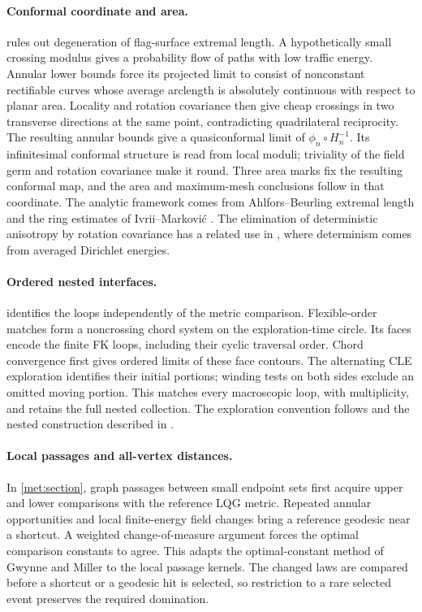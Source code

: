 \documentclass[11pt]{article}
\numberwithin{equation}{section}
\theoremstyle{definition}
\theoremstyle{remark}
\newcommand{\1}{\mathbf 1}
\begin{document}
\paragraph{Conformal coordinate and area.}
 rules out degeneration of flag-surface extremal
length. A hypothetically small crossing modulus gives a probability
flow of paths with low traffic energy. Annular lower bounds force its
projected limit to consist of nonconstant rectifiable curves whose
average arclength is absolutely continuous with respect to planar area.
Locality and rotation covariance then give cheap crossings in two
transverse directions at the same point, contradicting quadrilateral
reciprocity. The resulting annular bounds give a quasiconformal limit
of $\phi_n\circ H_n^{-1}$. Its infinitesimal conformal structure is
read from local moduli; triviality of the field germ and rotation
covariance make it round. Three area marks fix the resulting conformal
map, and the area and maximum-mesh conclusions follow in that coordinate.
The analytic framework comes from Ahlfors--Beurling extremal length
\citep{AhlforsBeurling1952ConformalInvariants} and the ring estimates of
Ivrii--Markovi\'c \citep{IvriiMarkovic2019}. The elimination of
deterministic anisotropy by rotation covariance has a related use in
\citet[Section~4.4]{HoldenYuUniformization}, where determinism comes
from averaged Dirichlet energies.

\paragraph{Ordered nested interfaces.}
 identifies the loops independently of the metric
comparison. Flexible-order matches form a noncrossing chord system
on the exploration-time circle. Its faces encode the finite FK loops,
including their cyclic traversal order. Chord convergence first gives
ordered limits of these face contours. The alternating CLE exploration
identifies their initial portions; winding tests on both sides exclude
an omitted moving portion. This matches every macroscopic loop, with
multiplicity, and retains the full nested collection. The exploration
convention follows \citet{SheffieldExplorationTrees,MillerSheffieldIGIV}
and the nested construction described in
\citet[Section~2.1.6]{AruHoldenPowellSunCritical}.

\paragraph{Local passages and all-vertex distances.}
In \cref{met:section}, graph passages between small endpoint sets
first acquire upper and lower comparisons with the reference LQG
metric. Repeated annular opportunities and local finite-energy field
changes bring a reference geodesic near a shortcut. A weighted
change-of-measure argument forces the optimal comparison constants
to agree. This adapts the optimal-constant method of Gwynne and
Miller \citep[Section~1.5 and Sections~3--6]{GwynneMillerMetric} to
the local passage kernels. The changed laws are compared before a
shortcut or a geodesic hit is selected, so restriction to a rare
selected event preserves the required domination.
\end{document}
